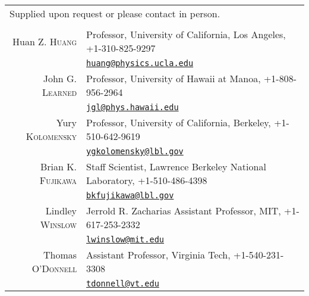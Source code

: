 \documentclass[10pt]{article} %
\begin{document}
\noindent\begin{tabular}{rp{12cm}}
\multicolumn{2}{l}{\footnotesize{Supplied upon request or please contact in
	person.}}\\
\multicolumn{2}{c}{}\\

Huan Z. \textsc{Huang} & Professor, University of California, Los Angeles, +1-310-825-9297\\
& \href{mailto:huang@physics.ucla.edu}{\nolinkurl{huang@physics.ucla.edu}}\\

John G. \textsc{Learned} & Professor, University of Hawaii at Manoa, +1-808-956-2964\\
& \href{mailto:jgl@phys.hawaii.edu}{\nolinkurl{jgl@phys.hawaii.edu}}\\

Yury \textsc{Kolomensky} & Professor, University of California, Berkeley, +1-510-642-9619\\
& \href{mailto:ygkolomensky@lbl.gov}{\nolinkurl{ygkolomensky@lbl.gov}}\\

Brian K. \textsc{Fujikawa} & Staff Scientist, Lawrence Berkeley National Laboratory, +1-510-486-4398\\
& \href{mailto:bkfujikawa@lbl.gov}{\nolinkurl{bkfujikawa@lbl.gov}}\\

Lindley \textsc{Winslow} & Jerrold R. Zacharias Assistant Professor, MIT, +1-617-253-2332\\
& \href{mailto:lwinslow@mit.edu}{\nolinkurl{lwinslow@mit.edu}}\\ 

Thomas \textsc{O'Donnell} & Assistant Professor, Virginia Tech, +1-540-231-3308\\
& \href{mailto:tdonnell@vt.edu}{\nolinkurl{tdonnell@vt.edu}}\\

%
%

\end{tabular}
\end{document}
